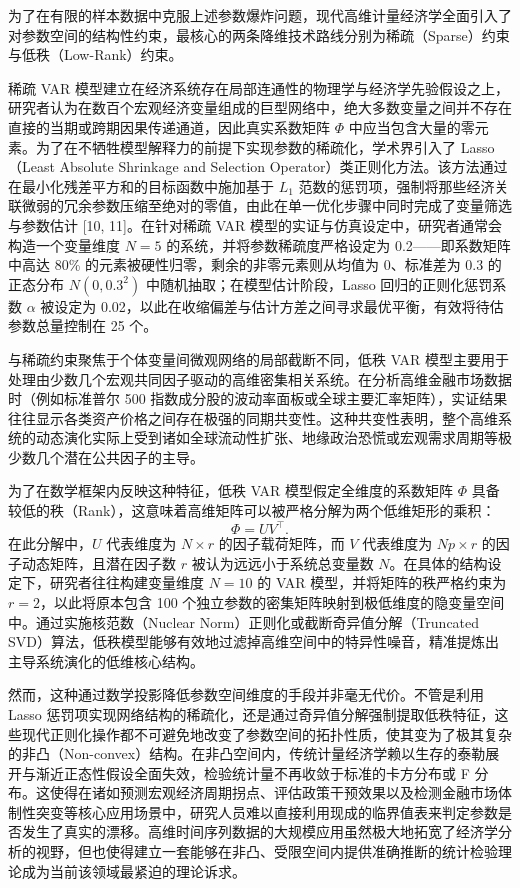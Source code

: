 \documentclass[UTF8,a4paper,12pt]{ctexbook}
\begin{document}
为了在有限的样本数据中克服上述参数爆炸问题，现代高维计量经济学全面引入了对参数空间的结构性约束，最核心的两条降维技术路线分别为稀疏（Sparse）约束与低秩（Low-Rank）约束。

稀疏 VAR 模型建立在经济系统存在局部连通性的物理学与经济学先验假设之上，研究者认为在数百个宏观经济变量组成的巨型网络中，绝大多数变量之间并不存在直接的当期或跨期因果传递通道，因此真实系数矩阵 $\Phi$ 中应当包含大量的零元素。为了在不牺牲模型解释力的前提下实现参数的稀疏化，学术界引入了 Lasso（Least Absolute Shrinkage and Selection Operator）类正则化方法。该方法通过在最小化残差平方和的目标函数中施加基于 $L_1$ 范数的惩罚项，强制将那些经济关联微弱的冗余参数压缩至绝对的零值，由此在单一优化步骤中同时完成了变量筛选与参数估计 [10, 11]。在针对稀疏 VAR 模型的实证与仿真设定中，研究者通常会构造一个变量维度 $N=5$ 的系统，并将参数稀疏度严格设定为 0.2——即系数矩阵中高达 80\% 的元素被硬性归零，剩余的非零元素则从均值为 0、标准差为 0.3 的正态分布 $N(0, 0.3^2)$ 中随机抽取；在模型估计阶段，Lasso 回归的正则化惩罚系数 $\alpha$ 被设定为 0.02，以此在收缩偏差与估计方差之间寻求最优平衡，有效将待估参数总量控制在 25 个。

与稀疏约束聚焦于个体变量间微观网络的局部截断不同，低秩 VAR 模型主要用于处理由少数几个宏观共同因子驱动的高维密集相关系统。在分析高维金融市场数据时（例如标准普尔 500 指数成分股的波动率面板或全球主要汇率矩阵），实证结果往往显示各类资产价格之间存在极强的同期共变性。这种共变性表明，整个高维系统的动态演化实际上受到诸如全球流动性扩张、地缘政治恐慌或宏观需求周期等极少数几个潜在公共因子的主导。

为了在数学框架内反映这种特征，低秩 VAR 模型假定全维度的系数矩阵 $\Phi$ 具备较低的秩（Rank），这意味着高维矩阵可以被严格分解为两个低维矩形的乘积：
\begin{equation}
\Phi = U V^{\top}.
\end{equation}
在此分解中，$U$ 代表维度为 $N \times r$ 的因子载荷矩阵，而 $V$ 代表维度为 $Np \times r$ 的因子动态矩阵，且潜在因子数 $r$ 被认为远远小于系统总变量数 $N$。在具体的结构设定下，研究者往往构建变量维度 $N=10$ 的 VAR 模型，并将矩阵的秩严格约束为 $r=2$，以此将原本包含 100 个独立参数的密集矩阵映射到极低维度的隐变量空间中。通过实施核范数（Nuclear Norm）正则化或截断奇异值分解（Truncated SVD）算法，低秩模型能够有效地过滤掉高维空间中的特异性噪音，精准提炼出主导系统演化的低维核心结构。

然而，这种通过数学投影降低参数空间维度的手段并非毫无代价。不管是利用 Lasso 惩罚项实现网络结构的稀疏化，还是通过奇异值分解强制提取低秩特征，这些现代正则化操作都不可避免地改变了参数空间的拓扑性质，使其变为了极其复杂的非凸（Non-convex）结构。在非凸空间内，传统计量经济学赖以生存的泰勒展开与渐近正态性假设全面失效，检验统计量不再收敛于标准的卡方分布或 F 分布。这使得在诸如预测宏观经济周期拐点、评估政策干预效果以及检测金融市场体制性突变等核心应用场景中，研究人员难以直接利用现成的临界值表来判定参数是否发生了真实的漂移。高维时间序列数据的大规模应用虽然极大地拓宽了经济学分析的视野，但也使得建立一套能够在非凸、受限空间内提供准确推断的统计检验理论成为当前该领域最紧迫的理论诉求。
\end{document}
